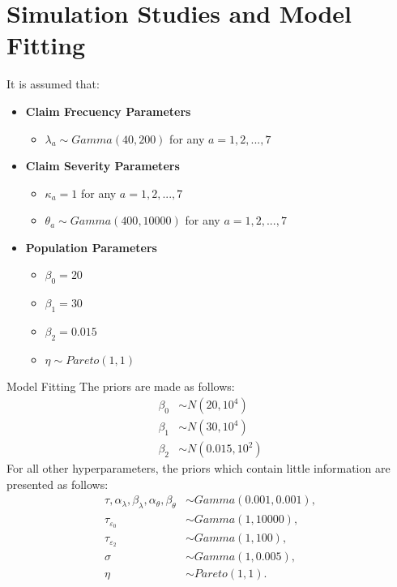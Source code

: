 \documentclass[10pt]{beamer} %
\begin{document}
\section{Simulation Studies and Model Fitting}
\begin{frame}{}
    It is assumed that: \\
\begin{itemize}
	\item \textbf{Claim Frecuency Parameters}
	\begin{itemize}
		\item $\lambda_{a}\sim Gamma(40,200)$ for any $a=1,2,...,7$
	\end{itemize}
	\item \textbf{Claim Severity Parameters}
	\begin{itemize}
		\item $\kappa_{a}=1$ for any $a=1,2,...,7$
		\item $\theta_{a}\sim Gamma(400,10000)$ for any $a=1,2,...,7$ 
	\end{itemize}
	\item \textbf{Population Parameters}
	\begin{itemize}
		\item $\beta_{0}=20$
		\item $\beta_{1}=30$
		\item $\beta_{2}=0.015$
		\item $\eta\sim Pareto(1,1)$	
	\end{itemize}
\end{itemize}
\end{frame}
\begin{frame}{Model Fitting}
    The priors are made as follows:
\begin{align*}
    \beta_0&\sim N(20, 10^4)\\
    \beta_1&\sim N(30, 10^4)\\
    \beta_2&\sim N(0.015, 10^2)
\end{align*}
For all other hyperparameters, the priors which contain little information are presented as follows:
\begin{align*}
    \tau,\alpha_\lambda,\beta_\lambda,\alpha_\theta,\beta_\theta&\sim Gamma(0.001,0.001),\\
    \tau_{\varepsilon_0}&\sim Gamma(1,10000),\\
    \tau_{\varepsilon_2}&\sim Gamma(1,100),\\
    \sigma&\sim Gamma(1,0.005),\\
    \eta&\sim Pareto(1,1).
\end{align*}
\end{frame}
\end{document}
